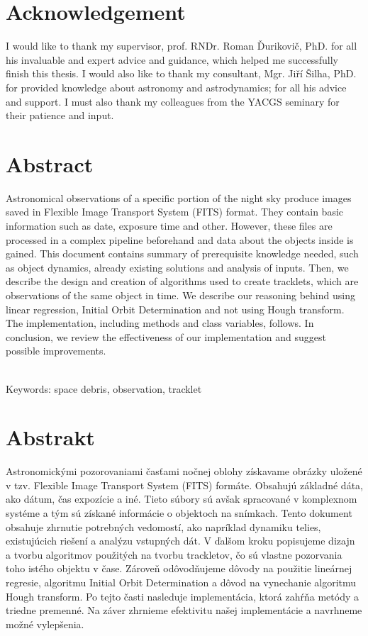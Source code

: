 \documentclass[12pt, a4paper, oneside]{book}
\begin{document}
\chapter*{Acknowledgement}\label{chap:thank_you}
I would like to thank my supervisor, prof. RNDr. Roman Ďurikovič, PhD. for all his invaluable and expert advice and guidance, which helped me successfully finish this thesis. I would also like to thank my consultant, Mgr. Jiří Šilha, PhD. for provided knowledge about astronomy and astrodynamics; for all his advice and support. I must also thank my colleagues from the YACGS seminary for their patience and input.
\vfill\eject 

\chapter*{Abstract}\label{chap:abstract_en}
Astronomical observations of a specific portion of the night sky produce images saved in Flexible Image Transport System (FITS) format. They contain basic information such as date, exposure time and other. However, these files are processed in a complex pipeline beforehand and data about the objects inside is gained. This document contains summary of prerequisite knowledge needed, such as object dynamics, already existing solutions and analysis of inputs. Then, we describe the design and creation of algorithms used to create tracklets, which are observations of the same object in time. We describe our reasoning behind using linear regression, Initial Orbit Determination and not using Hough transform. The implementation, including methods and class variables, follows. In conclusion, we review the effectiveness of our implementation and suggest possible improvements.

~\\
Keywords: space debris, observation, tracklet
\vfill\eject 

\chapter*{Abstrakt}\label{chap:abstract_sk}
Astronomickými pozorovaniami časťami nočnej oblohy získavame obrázky uložené v tzv. Flexible Image Transport System (FITS) formáte. Obsahujú základné dáta, ako dátum, čas expozície a iné. Tieto súbory sú avšak spracované v komplexnom systéme a tým sú získané informácie o objektoch na snímkach. Tento dokument obsahuje zhrnutie potrebných vedomostí, ako napríklad dynamiku telies, existujúcich riešení a analýzu vstupných dát. V ďalšom kroku popisujeme dizajn a tvorbu algoritmov použitých na tvorbu trackletov, čo sú vlastne pozorvania toho istého objektu v čase. Zároveň odôvodňujeme dôvody na použitie lineárnej regresie, algoritmu Initial Orbit Determination a dôvod na vynechanie algoritmu Hough transform. Po tejto časti nasleduje implementácia, ktorá zahŕňa metódy a triedne premenné. Na záver zhrnieme efektivitu našej implementácie a navrhneme možné vylepšenia.
\end{document}
